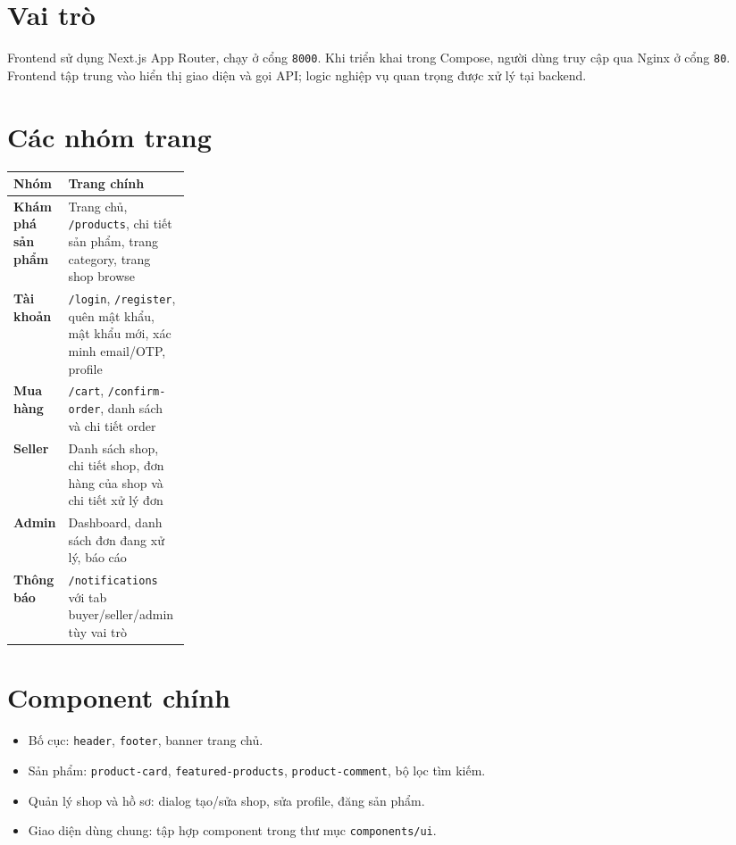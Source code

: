 \documentclass[12pt]{article}
\begin{document}

\section{Vai trò}
Frontend sử dụng Next.js App Router, chạy ở cổng \texttt{8000}. Khi triển khai trong Compose, người dùng truy cập qua Nginx ở cổng \texttt{80}. Frontend tập trung vào hiển thị giao diện và gọi API; logic nghiệp vụ quan trọng được xử lý tại backend.

\section{Các nhóm trang}
\begin{tabularx}{\linewidth}{>{\bfseries}p{0.23\linewidth} X}
\toprule
Nhóm & Trang chính \\
\midrule
Khám phá sản phẩm & Trang chủ, \texttt{/products}, chi tiết sản phẩm, trang category, trang shop browse \\
Tài khoản & \texttt{/login}, \texttt{/register}, quên mật khẩu, mật khẩu mới, xác minh email/OTP, profile \\
Mua hàng & \texttt{/cart}, \texttt{/confirm-order}, danh sách và chi tiết order \\
Seller & Danh sách shop, chi tiết shop, đơn hàng của shop và chi tiết xử lý đơn \\
Admin & Dashboard, danh sách đơn đang xử lý, báo cáo \\
Thông báo & \texttt{/notifications} với tab buyer/seller/admin tùy vai trò \\
\bottomrule
\end{tabularx}

\section{Component chính}
\begin{itemize}
  \item Bố cục: \texttt{header}, \texttt{footer}, banner trang chủ.
  \item Sản phẩm: \texttt{product-card}, \texttt{featured-products}, \texttt{product-comment}, bộ lọc tìm kiếm.
  \item Quản lý shop và hồ sơ: dialog tạo/sửa shop, sửa profile, đăng sản phẩm.
  \item Giao diện dùng chung: tập hợp component trong thư mục \texttt{components/ui}.
\end{itemize}
\end{document}
